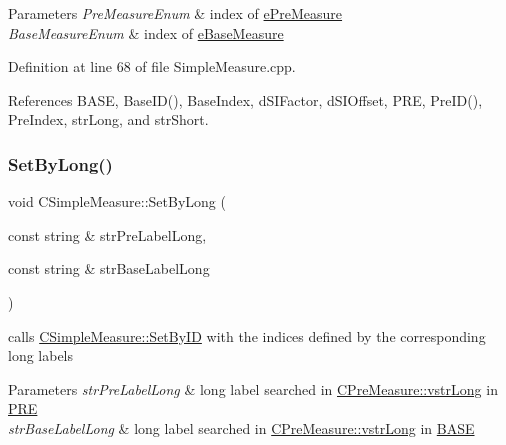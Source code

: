 \begin{DoxyParams}{Parameters}
{\em Pre\+Measure\+Enum} & index of \hyperlink{PreMeasure_8h_a6c81167b8d4c2badde42f81cb7214620}{e\+Pre\+Measure} \\
\hline
{\em Base\+Measure\+Enum} & index of \hyperlink{BaseMeasure_8h_ac90e5164ccf1f0d648fba7e94b229a11}{e\+Base\+Measure} \\
\hline
\end{DoxyParams}


Definition at line 68 of file Simple\+Measure.\+cpp.



References B\+A\+SE, Base\+I\+D(), Base\+Index, d\+S\+I\+Factor, d\+S\+I\+Offset, P\+RE, Pre\+I\+D(), Pre\+Index, str\+Long, and str\+Short.

\mbox{\label{classCSimpleMeasure_acebe5fcf7a5aa3464d9274f14c9f312b}} 
\subsubsection{\texorpdfstring{Set\+By\+Long()}{SetByLong()}}
{\footnotesize\ttfamily void C\+Simple\+Measure\+::\+Set\+By\+Long (\begin{DoxyParamCaption}\item[{const string \&}]{str\+Pre\+Label\+Long,  }\item[{const string \&}]{str\+Base\+Label\+Long }\end{DoxyParamCaption})}



calls \hyperlink{classCSimpleMeasure_a6945aa333dca5623482d38cd9a7e3225}{C\+Simple\+Measure\+::\+Set\+By\+ID} with the indices defined by the corresponding long labels 


\begin{DoxyParams}{Parameters}
{\em str\+Pre\+Label\+Long} & long label searched in \hyperlink{classCVectorHandle_a71bec0e385b9ca8e5ffa174b559da9f8}{C\+Pre\+Measure\+::vstr\+Long} in \hyperlink{PreMeasure_8h_a349316092037fdd0773335fab4e15ee8}{P\+RE} \\
\hline
{\em str\+Base\+Label\+Long} & long label searched in \hyperlink{classCVectorHandle_a71bec0e385b9ca8e5ffa174b559da9f8}{C\+Pre\+Measure\+::vstr\+Long} in \hyperlink{BaseMeasure_8h_a79bcfb6bde984f42d1124b068a509af7}{B\+A\+SE} \\
\hline
\end{DoxyParams}


